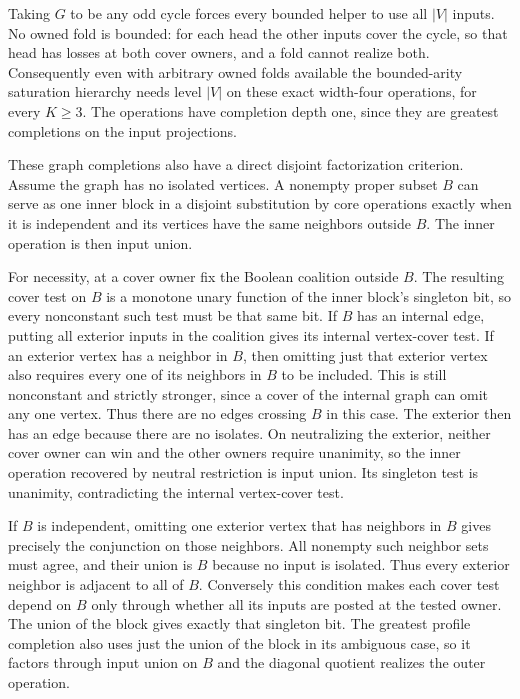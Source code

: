 Taking $G$ to be any odd cycle forces every bounded helper
to use all $|V|$ inputs. No owned fold is bounded: for each
head the other inputs cover the cycle, so that head has
losses at both cover owners, and a fold cannot realize both.
Consequently even with arbitrary owned folds available the
bounded-arity saturation hierarchy needs level $|V|$ on
these exact width-four operations, for every $K\ge3$.
The operations have completion depth one, since they are
greatest completions on the input projections.

These graph completions also have a direct disjoint
factorization criterion. Assume the graph has no
isolated vertices. A nonempty proper subset $B$ can
serve as one inner block in a disjoint substitution
by core operations exactly when it is independent
and its vertices have the same neighbors outside
$B$. The inner operation is then input union.

For necessity, at a cover owner fix the Boolean
coalition outside $B$. The resulting cover test on
$B$ is a monotone unary function of the inner
block's singleton bit, so every nonconstant such
test must be that same bit. If $B$ has an internal
edge, putting all exterior inputs in the coalition
gives its internal vertex-cover test. If an exterior
vertex has a neighbor in $B$, then omitting just
that exterior vertex also requires every one of
its neighbors in $B$ to be included. This is still
nonconstant and strictly stronger, since a cover
of the internal graph can omit any one vertex.
Thus there are no edges crossing $B$ in this case.
The exterior then has an edge because there are no
isolates. On neutralizing the exterior, neither
cover owner can win and the other owners require
unanimity, so the inner operation recovered by
neutral restriction is input union. Its singleton
test is unanimity, contradicting the internal
vertex-cover test.

If $B$ is independent, omitting one exterior
vertex that has neighbors in $B$ gives precisely
the conjunction on those neighbors. All nonempty
such neighbor sets must agree, and their union is
$B$ because no input is isolated. Thus every
exterior neighbor is adjacent to all of $B$.
Conversely this condition makes each cover test
depend on $B$ only through whether all its inputs
are posted at the tested owner. The union of the
block gives exactly that singleton bit. The
greatest profile completion also uses just the
union of the block in its ambiguous case, so it
factors through input union on $B$ and the
diagonal quotient realizes the outer operation.

